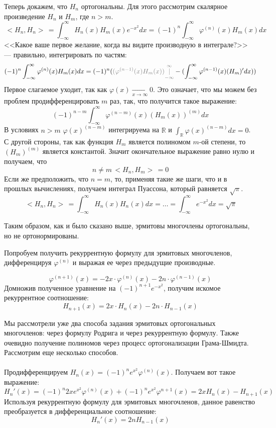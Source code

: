 \documentclass[12pt]{article}
\newcommand{\scal}[2]{\, < \!\! #1, #2 \!\! > \,}
\begin{document}
	Теперь докажем, что $H_n$ ортогональны. Для этого рассмотрим скалярное произведение $H_n$ и $H_m$, где $n > m$.
	$$\scal{H_n}{H_n} = \int_{-\infty}^{\infty} H_n(x) H_m(x) e^{-x^2} dx = (-1)^n \int_{-\infty}^{\infty} \varphi^{(n)}(x) H_m(x) dx$$
	<<Какое ваше первое желание, когда вы видите производную в интеграле?>> --- правильно, интегрировать по частям:
	$$(-1)^n \int_{-\infty}^{\infty} \varphi^{(n)}(x) H_m(x) dx = (-1)^n ( {\color{gray}(\varphi^{(n-1)}(x) H_m(x)) 
	\underset{-\infty}{\overset{\infty}{|}}} - (\int_{-\infty}^{\infty} \varphi^{(n-1)}(x) (H_m)' dx ) )$$
	Первое слагаемое уходит, так как $\varphi(x) \underset{x \rightarrow \infty}{\rightarrow} 0$. Это означает, что мы можем без проблем
	продифференцировать $m$ раз, так, что получится такое выражение:
	$$(-1)^{n-m} \int_{-\infty}^{\infty} \varphi^{(n-m)}(x) (H_m(x))^{(m)} dx$$
	В условиях $n > m$ $\varphi(x)^{(n-m)}$ интегрируема на $\mathbb{R}$ и $\int_{\mathbb{R}} \varphi(x)^{(n-m)} dx = 0$. С другой 
	стороны, так как функция $H_m$ является полиномом $m$-ой степени, то $(H_m)^{(m)}$ является константой. Значит окончательное выражение
	равно нулю и получаем, что
	$$n \neq m \scal{H_n}{H_m} = 0$$
	Если же предположить, что $n=m$, то, применяя такие же шаги, что и в прошлых вычислениях, получаем интеграл Пуассона, который 
	равняется $\sqrt{\pi}$.
	$$\scal{H_n}{H_n} = \int_{-\infty}^{\infty} H_n(x) H_n(x) dx = \dots = \int_{-\infty}^{\infty} e^{-x^2} dx = \sqrt{\pi}$$
	
	Таким образом, как и было сказано выше, эрмитовы многочлены ортогональны, но не ортонормированы.
	
	Попробуем получить рекуррентную формулу для эрмитовых многочленов, дифференцируя $\varphi^{(n)}$ и выражая ее через предыдущие
	производные.
	
	$$ \varphi^{(n+1)}(x) = -2x \cdot \varphi^{(n)}(x) - 2n \cdot \varphi^{(n-1)}(x) $$
	Домножив полученное уравнение на $(-1)^{n+1} e^{-x^2}$, получим искомое рекуррентное соотношение:
	$$H_{n+1} (x) = 2x \cdot H_n(x) - 2n \cdot H_{n-1} (x)$$
	
	Мы рассмотрели уже два способа задания эрмитовых ортогональных многочленов: через формулу Родрига и через рекуррентную формулу.
	Также очевидно получение полиномов через процесс ортогонализации Грама-Шмидта. Рассмотрим еще несколько способов.\\ \\
	
	Продифференцируем $H_n(x) = (-1)^n e^{x^2} \varphi^{(n)}(x)$. Получаем вот такое выражение:
	$$H_n'(x) = (-1)^n 2x e^{x^2} \varphi^{(n)}(x) + (-1)^n e^{x^2} \varphi^{n+1}(x) = 2x H_n(x) - H_{n+1}(x)$$
	Используя рекуррентную формулу для эрмитовых многочленов, данное равенство преобразуется в дифференциальное соотношение:
	$$H_n'(x) = 2n H_{n-1}(x)$$
	
\end{document}
